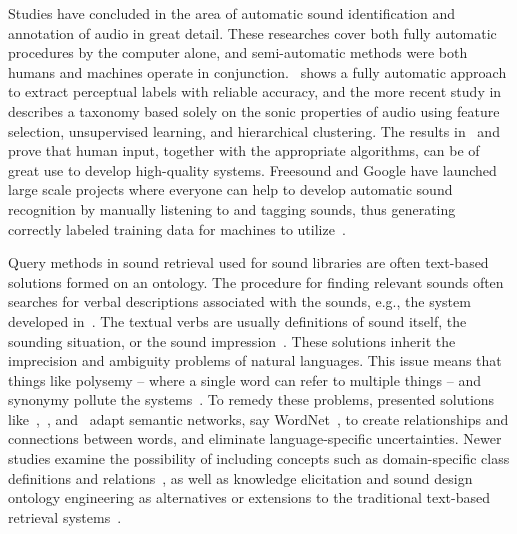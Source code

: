 Studies have concluded in the area of automatic sound identification and annotation of audio in great detail. These researches cover both fully automatic procedures by the computer alone, and semi-automatic methods were both humans and machines operate in conjunction.~\cite{rep:morphological_sound_description_computational_model_and_usability_evaluation} shows a fully automatic approach to extract perceptual labels with reliable accuracy, and the more recent study in~\cite{rep:unsupervised_taxonomy_of_sound_effects} describes a taxonomy based solely on the sonic properties of audio using feature selection, unsupervised learning, and hierarchical clustering. The results in~\cite{rep:identification_of_perceptual_qualities_in_textural_sounds_using_the_repertory_grid_method} and~\cite{rep:on_automated_annotation_of_acousmatic_music} prove that human input, together with the appropriate algorithms, can be of great use to develop high-quality systems. Freesound and Google have launched large scale projects where everyone can help to develop automatic sound recognition by manually listening to and tagging sounds, thus generating correctly labeled training data for machines to utilize~\cite{freesound:annotator, google:audioset}.

Query methods in sound retrieval used for sound libraries are often text-based solutions formed on an ontology. The procedure for finding relevant sounds often searches for verbal descriptions associated with the sounds, e.g., the system developed in~\cite{rep:ecrins_an_audiocontent_description_environment_for_sound_samples}. The textual verbs are usually definitions of sound itself, the sounding situation, or the sound impression~\cite{rep:sound_retrieval_with_intuitive_verbal_descriptions}. These solutions inherit the imprecision and ambiguity problems of natural languages. This issue means that things like polysemy – where a single word can refer to multiple things – and synonymy pollute the systems~\cite[2]{rep:knowledge_and_content-based_audio_retrieval_using_wordnet}. To remedy these problems, presented solutions like~\cite{rep:knowledge_and_content-based_audio_retrieval_using_wordnet},~\cite{rep:constructing_high-level_perceptual_audio_descriptors_for_textural_sounds}, and~\cite{rep:nearest-neighbor_automatic_sound_annotation_with_a_wordnet_taxonomy} adapt semantic networks, say WordNet~\cite{rep:wordnet_an_electronic_lexical_database}, to create relationships and connections between words, and eliminate language-specific uncertainties. Newer studies examine the possibility of including concepts such as domain-specific class definitions and relations~\cite{rep:extending_tagging_ontologies_with_domain_specific_knowledge}, as well as knowledge elicitation and sound design ontology engineering as alternatives or extensions to the traditional text-based retrieval systems~\cite{rep:an_approach_for_structuring_sound_sample_libraries_using_ontology}.

